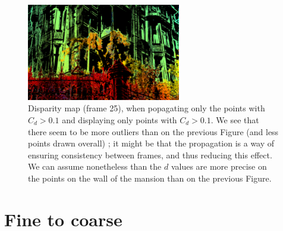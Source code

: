 \documentclass{article}
\theoremstyle{definition}
\begin{document}
\begin{figure}[ht]
  \centering
  \includegraphics[width=0.6\textwidth]{images/1520973007982_dmap_025.png}
  \caption{Disparity map (frame 25), when popagating only the points with $C_d > 0.1$ and displaying only points with $C_d > 0.1$. We see that there seem to be more outliers than on the previous Figure (and less points drawn overall) ; it might be that the propagation is a way of ensuring consistency between frames, and thus reducing this effect. We can assume nonetheless than the $d$ values are more precise on the points on the wall of the mansion than on the previous Figure.}
  \label{fig:propagation:disp}
\end{figure}



\clearpage
\section{Fine to coarse}
\end{document}
